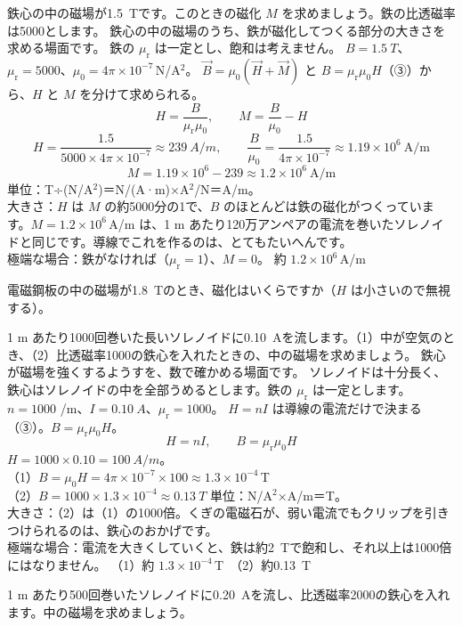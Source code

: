 \label{ph:電-7:ex1}
\begin{phreidai}[鉄の中の磁化の大きさ]
鉄心の中の磁場が\qty{1.5}{T}です。このときの磁化 $M$ を求めましょう。鉄の比透磁率は5000とします。
\phbamen
鉄心の中の磁場のうち、鉄が磁化してつくる部分の大きさを求める場面です。
\phmushi
鉄の $\mu_{\mathrm r}$ は一定とし、飽和は考えません。
\phzu
$B=\qty{1.5}{T}$、$\mu_{\mathrm r}=5000$、$\mu_0=4\pi\times10^{-7}$\,N/A$^2$。
\phriyu
$\vec B=\mu_0(\vec H+\vec M)$ と $B=\mu_{\mathrm r}\mu_0H$（③）から、$H$ と $M$ を分けて求められる。
\phtateru
\[H=\frac{B}{\mu_{\mathrm r}\mu_0},\qquad M=\frac{B}{\mu_0}-H\]
\phtoku
\[H=\frac{1.5}{5000\times4\pi\times10^{-7}}\approx\qty{239}{A/m},\qquad\frac{B}{\mu_0}=\frac{1.5}{4\pi\times10^{-7}}\approx1.19\times10^6\ \text{A/m}\]
\[M=1.19\times10^6-239\approx1.2\times10^6\ \text{A/m}\]
\phtashikame
単位：T÷(N/A$^2$)＝N/(A·m)×A$^2$/N＝A/m。\\
大きさ：$H$ は $M$ の約5000分の1で、$B$ のほとんどは鉄の磁化がつくっています。$M=1.2\times10^6$\,A/m は、1 m あたり120万アンペアの電流を巻いたソレノイドと同じです。導線でこれを作るのは、とてもたいへんです。\\
極端な場合：鉄がなければ（$\mu_{\mathrm r}=1$）、$M=0$。
\kotae 約 $1.2\times10^6$\,A/m
\end{phreidai}
\begin{jibun}
電磁鋼板の中の磁場が\qty{1.8}{T}のとき、磁化はいくらですか（$H$ は小さいので無視する）。
\end{jibun}

\label{ph:電-7:ex2}
\begin{phreidai}[鉄心を入れたソレノイド]
1 m あたり1000回巻いた長いソレノイドに\qty{0.10}{A}を流します。（1）中が空気のとき、（2）比透磁率1000の鉄心を入れたときの、中の磁場を求めましょう。
\phbamen
鉄心が磁場を強くするようすを、数で確かめる場面です。
\phmushi
ソレノイドは十分長く、鉄心はソレノイドの中を全部うめるとします。鉄の $\mu_{\mathrm r}$ は一定とします。
\phzu
$n=1000$ /m、$I=\qty{0.10}{A}$、$\mu_{\mathrm r}=1000$。
\phriyu
$H=nI$ は導線の電流だけで決まる（③）。$B=\mu_{\mathrm r}\mu_0H$。
\phtateru
\[H=nI,\qquad B=\mu_{\mathrm r}\mu_0H\]
\phtoku
$H=1000\times0.10=\qty{100}{A/m}$。\\
（1）$B=\mu_0H=4\pi\times10^{-7}\times100\approx1.3\times10^{-4}$\,T\\
（2）$B=1000\times1.3\times10^{-4}\approx\qty{0.13}{T}$
\phtashikame
単位：N/A$^2$×A/m＝T。\\
大きさ：（2）は（1）の1000倍。くぎの電磁石が、弱い電流でもクリップを引きつけられるのは、鉄心のおかげです。\\
極端な場合：電流を大きくしていくと、鉄は約\qty{2}{T}で飽和し、それ以上は1000倍にはなりません。
\kotae （1）約 $1.3\times10^{-4}$\,T　（2）約\qty{0.13}{T}
\end{phreidai}
\begin{jibun}
1 m あたり500回巻いたソレノイドに\qty{0.20}{A}を流し、比透磁率2000の鉄心を入れます。中の磁場を求めましょう。
\end{jibun}

